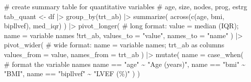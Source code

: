 \documentclass[
  letterpaper,
  DIV=11,
  numbers=noendperiod]{scrreprt}
\newenvironment{Shaded}{\begin{snugshade}}{\end{snugshade}}
\newcommand{\AttributeTok}[1]{\textcolor[rgb]{0.40,0.45,0.13}{#1}}
\newcommand{\CommentTok}[1]{\textcolor[rgb]{0.37,0.37,0.37}{#1}}
\newcommand{\FunctionTok}[1]{\textcolor[rgb]{0.28,0.35,0.67}{#1}}
\newcommand{\NormalTok}[1]{\textcolor[rgb]{0.00,0.23,0.31}{#1}}
\newcommand{\OtherTok}[1]{\textcolor[rgb]{0.00,0.23,0.31}{#1}}
\newcommand{\SpecialCharTok}[1]{\textcolor[rgb]{0.37,0.37,0.37}{#1}}
\newcommand{\StringTok}[1]{\textcolor[rgb]{0.13,0.47,0.30}{#1}}
\begin{document}
\begin{Shaded}
\begin{Highlighting}[]
\CommentTok{\# create summary table for quantitative variables}
\CommentTok{\# age, size, nodes, prog, estrg}
\NormalTok{tab\_quant }\OtherTok{\textless{}{-}}\NormalTok{ df }\SpecialCharTok{|\textgreater{}} 
  \FunctionTok{group\_by}\NormalTok{(trt\_ab) }\SpecialCharTok{|\textgreater{}} 
  \FunctionTok{summarize}\NormalTok{(}
    \FunctionTok{across}\NormalTok{(}\FunctionTok{c}\NormalTok{(age, bmi, bipllvef), med\_iqr)}
\NormalTok{  ) }\SpecialCharTok{|\textgreater{}} 
  \FunctionTok{pivot\_longer}\NormalTok{( }\CommentTok{\# long format: value = median (IQR); name = variable names}
    \SpecialCharTok{!}\NormalTok{trt\_ab,}
    \AttributeTok{values\_to =} \StringTok{"value"}\NormalTok{,}
    \AttributeTok{names\_to =} \StringTok{"name"}
\NormalTok{  ) }\SpecialCharTok{|\textgreater{}} 
  \FunctionTok{pivot\_wider}\NormalTok{( }\CommentTok{\# wide format: name = variable names; trt\_ab as columns}
    \AttributeTok{values\_from =}\NormalTok{ value,}
    \AttributeTok{names\_from =}\NormalTok{ trt\_ab}
\NormalTok{  ) }\SpecialCharTok{|\textgreater{}} 
  \FunctionTok{mutate}\NormalTok{(}
    \AttributeTok{name =} \FunctionTok{case\_when}\NormalTok{( }\CommentTok{\# format the variable names}
\NormalTok{      name }\SpecialCharTok{==} \StringTok{"age"} \SpecialCharTok{\textasciitilde{}} \StringTok{"Age (years)"}\NormalTok{,}
\NormalTok{      name }\SpecialCharTok{==} \StringTok{"bmi"} \SpecialCharTok{\textasciitilde{}} \StringTok{"BMI"}\NormalTok{,}
\NormalTok{      name }\SpecialCharTok{==} \StringTok{"bipllvef"} \SpecialCharTok{\textasciitilde{}} \StringTok{"LVEF (\%)"}
\NormalTok{    )}
\NormalTok{  )}



\end{Highlighting}
\end{Shaded}
\end{document}
